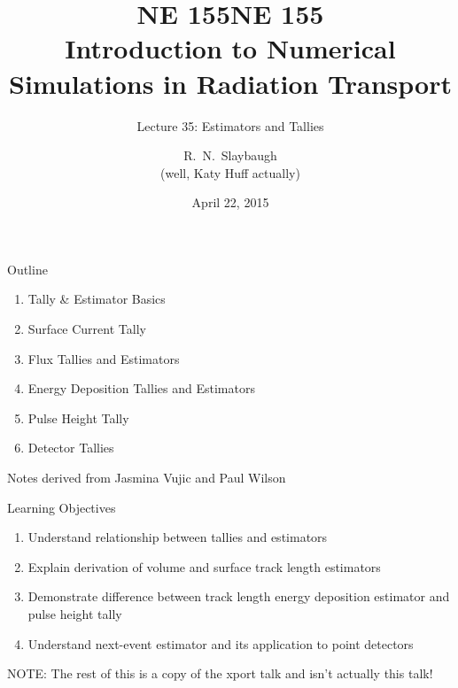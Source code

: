 \documentclass[xcolor=x11names,compress]{beamer}
\title{NE 155}
\author{R.\ N.\ Slaybaugh \\
(well, Katy Huff actually)}
\date{April 22, 2015}
\renewcommand{\(}{\begin{columns}}
\renewcommand{\)}{\end{columns}}
\newcommand{\<}[1]{\begin{column}{#1}}
\renewcommand{\>}{\end{column}}
\begin{document}
\begin{frame}
\title{NE 155\\Introduction to Numerical Simulations in Radiation Transport}
\subtitle{Lecture 35: Estimators and Tallies}
\titlepage
\end{frame}


\begin{frame}{Outline}

    \begin{enumerate}
    \item Tally \& Estimator Basics
    \item Surface Current Tally
    \item Flux Tallies and Estimators
    \item Energy Deposition Tallies and Estimators
    \item Pulse Height Tally
    \item Detector Tallies
    \end{enumerate}

\vspace*{1em}
Notes derived from Jasmina Vujic and Paul Wilson
\end{frame}



\begin{frame}{Learning Objectives}

    \begin{enumerate}
    \item Understand relationship between tallies
and estimators
    \item Explain derivation of volume and
surface track length estimators
    \item Demonstrate difference between track
length energy deposition estimator and
pulse height tally
    \item Understand next-event estimator and
its application to point detectors
    \end{enumerate}

NOTE: The rest of this is a copy of the xport talk and isn't actually this talk!

\end{frame}
\end{document}
